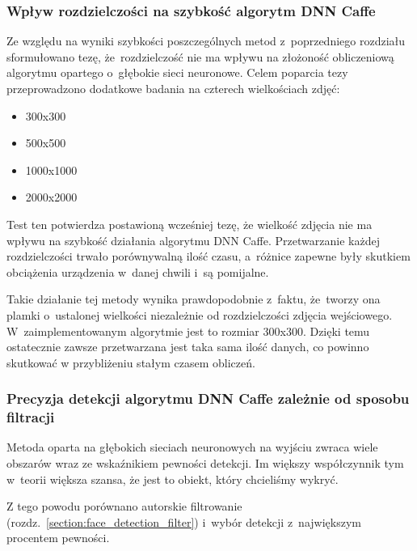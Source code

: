 \subsubsection{Wpływ rozdzielczości na szybkość algorytm DNN Caffe} \label{section:test_dnn_resolution_speed}

Ze względu na wyniki szybkości poszczególnych metod z~poprzedniego rozdziału sformułowano tezę, że~rozdzielczość nie ma wpływu na złożoność obliczeniową algorytmu opartego o~głębokie sieci neuronowe. Celem poparcia tezy przeprowadzono dodatkowe badania na czterech wielkościach zdjęć: 

\begin{itemize}
    \item 300x300
    \item 500x500
    \item 1000x1000
    \item 2000x2000
\end{itemize}



Test ten potwierdza postawioną wcześniej tezę, że wielkość zdjęcia nie ma wpływu na szybkość działania algorytmu DNN Caffe. Przetwarzanie każdej rozdzielczości trwało porównywalną ilość czasu, a~różnice zapewne były skutkiem obciążenia urządzenia w~danej chwili i~są pomijalne.

\par

Takie działanie tej metody wynika prawdopodobnie z~faktu, że~tworzy ona plamki o~ustalonej wielkości niezależnie od rozdzielczości zdjęcia wejściowego. W~zaimplementowanym algorytmie jest to rozmiar 300x300. Dzięki temu ostatecznie zawsze przetwarzana jest taka sama ilość danych, co powinno skutkować w przybliżeniu stałym czasem obliczeń.




\subsubsection{Precyzja detekcji algorytmu DNN Caffe zależnie od sposobu filtracji}

Metoda oparta na głębokich sieciach neuronowych na wyjściu zwraca wiele obszarów wraz ze wskaźnikiem pewności detekcji. Im większy współczynnik tym w~teorii większa szansa, że jest to obiekt, który chcieliśmy wykryć.

\par

Z tego powodu porównano autorskie filtrowanie (rozdz.~\hyperref[{section:face_detection_filter}]{\ref{section:face_detection_filter}}) i~wybór detekcji z~największym procentem pewności.


